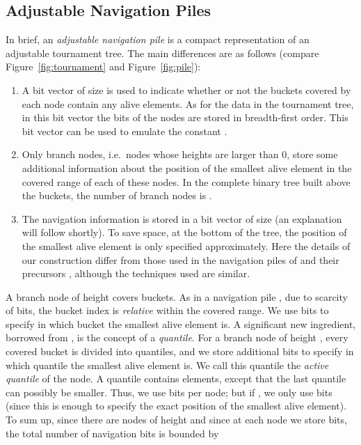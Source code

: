 \documentclass[final,onetabnum,onefignum,onethmnum]{siamltex}
\begin{document}
\subsection{Adjustable Navigation Piles} 
In brief, an \emph{adjustable navigation pile} is a compact
representation of an adjustable tournament tree.  The main differences
are as follows (compare Figure~\ref{fig:tournament} and
Figure~\ref{fig:pile}):
\begin{enumerate}
\item A bit vector of size  is used to indicate
  whether or not the buckets covered by each node contain any alive
  elements. As for the data in the tournament tree, in this bit vector the
  bits of the nodes are stored in breadth-first order. This bit vector
  can be used to emulate the constant .
\item Only branch nodes, i.e.~nodes whose heights are larger than
  0, store some additional information about the position of the
  smallest alive element in the covered range of each of these nodes. In the
  complete binary tree built above the buckets, the number of branch nodes
  is .
\item The navigation information is stored in a bit vector of
  size  (an explanation will follow shortly).  To save space,
  at the bottom of the tree, the position of the smallest alive
  element is only specified approximately. Here the details of our
  construction differ from those used in the navigation piles of
  \cite{KV03} and their precursors \cite{PR98}, although the
  techniques used are similar.
\end{enumerate}

A branch node of height  covers
 buckets. As in a navigation pile \cite{KV03}, due to scarcity of bits, 
the bucket index is \emph{relative} within the covered range. We use  bits to
specify in which bucket the smallest alive element is.  
A significant new ingredient, borrowed from \cite{PR98}, is the concept of a
\emph{quantile}. For a branch node of height
, every covered bucket is divided into  quantiles, and we
store additional  bits to specify in which quantile the smallest
alive element is.  We call this quantile the {\it active quantile} of the node. 
A quantile contains 
elements, except that the last quantile can possibly be smaller.
Thus, we use  bits per node; but if , we
only use  bits (since this is enough to
specify the exact position of the smallest alive element).  To sum up,
since there are  nodes of height  and since at each
node we store  bits, the total number of
navigation bits is bounded by
\end{document}
